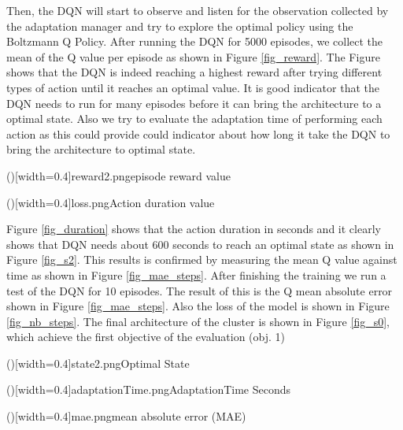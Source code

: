 \documentclass{ieeeaccess}
\begin{document}
Then, the DQN will start to observe and listen for the observation collected by the adaptation manager and try to explore the optimal policy using the Boltzmann Q Policy. After running the DQN for 5000 episodes, we collect the mean of the Q value per episode as shown in Figure \ref{fig_reward}. The Figure shows that the DQN is indeed reaching a highest reward after trying different types of action until it reaches an optimal value. It is good indicator that the DQN needs to run for many episodes before it can bring the architecture to a optimal state. Also we try to evaluate the adaptation time of performing each action as this could provide could indicator about how long it take the DQN to bring the architecture to optimal state.

 \Figure[!t]()[width=0.4\textwidth]{reward2.png}{episode reward value \label{fig_reward}}
 
 \Figure[!t]()[width=0.4\textwidth]{loss.png}{Action duration value \label{fig_duration}}
 
 Figure \ref{fig_duration} shows that the action duration in seconds and it clearly shows that DQN needs about 600 seconds to reach an optimal state as shown in Figure \ref{fig_s2}. This results is confirmed by measuring the mean Q value against time as shown in Figure \ref{fig_mae_steps}. After finishing the training we run a test of the DQN for 10 episodes. The result of this is the Q mean absolute error shown in Figure \ref{fig_mae_steps}. Also the loss of the model is shown in Figure \ref{fig_nb_steps}. The final architecture of the cluster is shown in Figure \ref{fig_s0}, which achieve the first objective of the evaluation (obj. 1) 




\Figure[!t]()[width=0.4\textwidth]{state2.png}{Optimal State  \label{fig_s2}}

\Figure[!t]()[width=0.4\textwidth]{adaptationTime.png}{AdaptationTime Seconds  \label{fig_nb_steps}}

\Figure[!t]()[width=0.4\textwidth]{mae.png}{mean absolute error (MAE)  \label{fig_mae_steps}}
\end{document}
